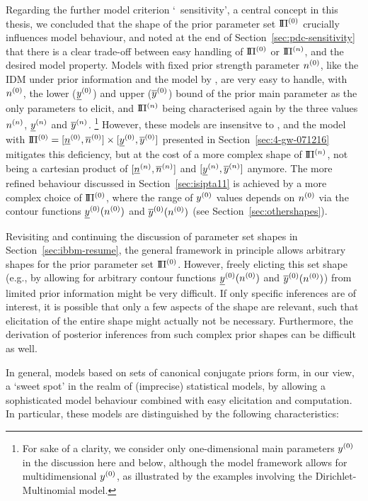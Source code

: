 Regarding the further model criterion `\pdc\ sensitivity',
a central concept in this thesis,
we concluded that the shape of the prior parameter set $\text{I}\!\Pi^{(0)}$
crucially influences model behaviour, 
and noted at the end of Section~\ref{sec:pdc-sensitivity} that
there is a clear trade-off between easy handling of $\text{I}\!\Pi^{(0)}$ or $\text{I}\!\Pi^{(n)}$, and the desired model property.
Models with fixed prior strength parameter $n^{(0)}$,
like the IDM under prior information and the model by \textcite{2005:quaeghebeurcooman},
are very easy to handle,
with $n^{(0)}$, the lower ($\underline{y}^{(0)}$) and upper ($\overline{y}^{(0)}$) bound of the prior main parameter as the only parameters to elicit,
and $\text{I}\!\Pi^{(n)}$ being characterised again by the three values $n^{(n)}$, $\underline{y}^{(n)}$ and $\overline{y}^{(n)}$.%
\footnote{For sake of a clarity,
we consider only one-dimensional main parameters $y^{(0)}$ in the discussion here and below,
although the model framework allows for multidimensional $y^{(0)}$,
as illustrated by the examples involving the Dirichlet-Multinomial model.}
However, these models are insensitve to \pdc,
and the model with $\text{I}\!\Pi^{(0)} = [\underline{n}^{(0)}, \overline{n}^{(0)}] \times [\underline{y}^{(0)}, \overline{y}^{(0)}]$
presented in Section~\ref{sec:4-gw-071216}
mitigates this deficiency, but at the cost of a more complex shape of $\text{I}\!\Pi^{(n)}$,
not being a cartesian product of $[\underline{n}^{(n)}, \overline{n}^{(n)}]$ and $[\underline{y}^{(n)}, \overline{y}^{(n)}]$ anymore.
The more refined behaviour discussed in Section~\ref{sec:isipta11}
is achieved by a more complex choice of $\text{I}\!\Pi^{(0)}$,
where the range of $y^{(0)}$ values depends on $n^{(0)}$
via the contour functions $\underline{y}^{(0)}(n^{(0)})$ and $\overline{y}^{(0)}(n^{(0)})$
(see Section~\ref{sec:othershapes}).

Revisiting and continuing the discussion of parameter set shapes in Section~\ref{sec:ibbm-resume},
the general framework in principle allows arbitrary shapes for the prior parameter set $\text{I}\!\Pi^{(0)}$.
However, freely elicting this set shape
(e.g., by allowing for arbitrary contour functions $\underline{y}^{(0)}(n^{(0)})$ and $\overline{y}^{(0)}(n^{(0)})$)
from limited prior information might be very difficult.
If only specific inferences are of interest,
it is possible that only a few aspects of the shape are relevant,
such that elicitation of the entire shape might actually not be necessary.
Furthermore, the derivation of posterior inferences from
such complex prior shapes can be difficult as well.

In general, %
models based on sets of canonical conjugate priors form, in our view,
a `sweet spot' in the realm of (imprecise) statistical models,
by allowing a sophisticated model behaviour
combined with easy elicitation and computation.
In particular,
these models are distinguished by the following characteristics:

